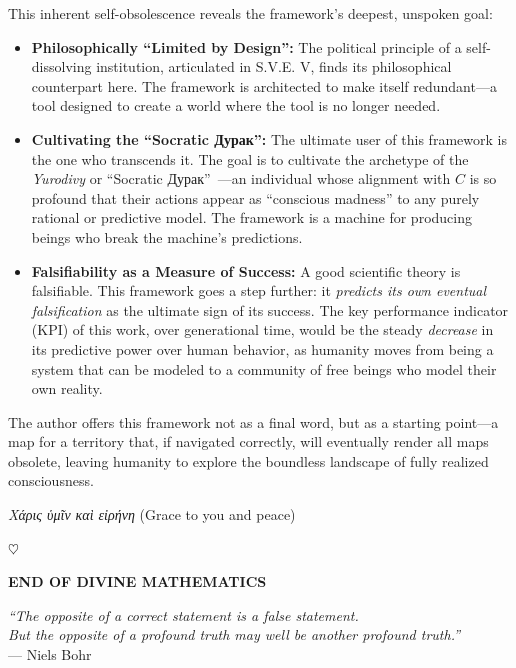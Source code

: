 \documentclass[11pt,a4paper]{article}
\theoremstyle{definition}
\theoremstyle{remark}
\begin{document}
\begin{small}
\begin{enumerate}
\begin{protocol}
This inherent self-obsolescence reveals the framework's deepest, unspoken goal:

\begin{itemize}
    \item \textbf{Philosophically ``Limited by Design'':} The political principle of a self-dissolving institution, articulated in S.V.E. V, finds its philosophical counterpart here. The framework is architected to make itself redundant—a tool designed to create a world where the tool is no longer needed.
    
    \item \textbf{Cultivating the ``Socratic Дурак'':} The ultimate user of this framework is the one who transcends it. The goal is to cultivate the archetype of the \textit{Yurodivy} or ``Socratic Дурак''~\cite{fool_7735_7736}—an individual whose alignment with $C$ is so profound that their actions appear as ``conscious madness'' to any purely rational or predictive model. The framework is a machine for producing beings who break the machine's predictions.
    
    \item \textbf{Falsifiability as a Measure of Success:} A good scientific theory is falsifiable. This framework goes a step further: it \textit{predicts its own eventual falsification} as the ultimate sign of its success. The key performance indicator (KPI) of this work, over generational time, would be the steady \textit{decrease} in its predictive power over human behavior, as humanity moves from being a system that can be modeled to a community of free beings who model their own reality.
\end{itemize}

The author offers this framework not as a final word, but as a starting point—a map for a territory that, if navigated correctly, will eventually render all maps obsolete, leaving humanity to explore the boundless landscape of fully realized consciousness.

\textit{Χάρις ὑμῖν καὶ εἰρήνη} (Grace to you and peace)

\begin{center}
\(\heartsuit\)

\vspace{2em}

\textbf{END OF DIVINE MATHEMATICS}

\vspace{1em}

\textit{``The opposite of a correct statement is a false statement.\\
But the opposite of a profound truth may well be another profound truth.''}\\
— Niels Bohr


\end{center}
\end{protocol}
\end{enumerate}
\end{small}
\end{document}

